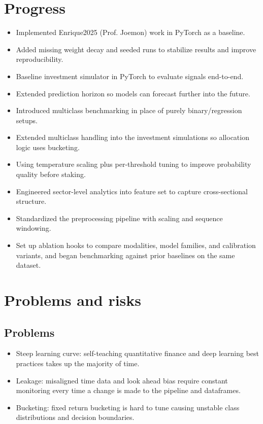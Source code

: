 \documentclass[11pt]{article}
\begin{document}
\section{Progress}\label{progress}
\begin{itemize}
    \setlength{\itemsep}{1pt}
    \setlength{\parskip}{0pt}
    \setlength{\parsep}{0pt}
    \item Implemented Enrique2025 (Prof. Joemon) work in PyTorch as a baseline.
    \item Added missing weight decay and seeded runs to stabilize results and improve reproducibility.
    \item Baseline investment simulator in PyTorch to evaluate signals end-to-end.
    \item Extended prediction horizon so models can forecast further into the future.
    \item Introduced multiclass benchmarking in place of purely binary/regression setups.
    \item Extended multiclass handling into the investment simulations so allocation logic uses bucketing.
    \item Using temperature scaling plus per-threshold tuning to improve probability quality before staking.
    \item Engineered sector-level analytics into feature set to capture cross-sectional structure.
    \item Standardized the preprocessing pipeline with scaling and sequence windowing.
    \item Set up ablation hooks to compare modalities, model families, and calibration variants, and began benchmarking against prior baselines on the same dataset.
\end{itemize}

\section{Problems and risks}\label{problems-and-risks}
\subsection{Problems}\label{problems}
\begin{itemize}
    \setlength{\itemsep}{1pt}
    \setlength{\parskip}{0pt}
    \setlength{\parsep}{0pt}
    \item Steep learning curve: self-teaching quantitative finance and deep learning best practices takes up the majority of time.
    \item Leakage: misaligned time data and look ahead bias require constant monitoring every time a change is made to the pipeline and dataframes. 
    \item Bucketing: fixed return bucketing is hard to tune causing unstable class distributions and decision boundaries.
\end{itemize}
\end{document}
